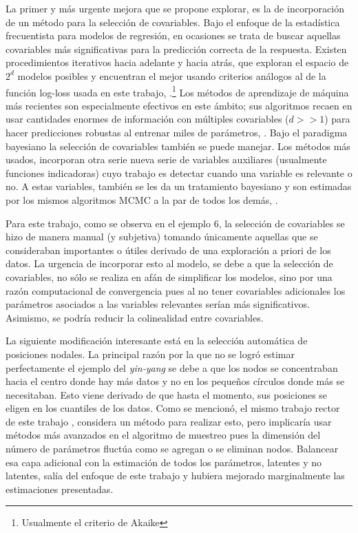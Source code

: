 \documentclass[../Main/Main.tex]{subfiles}
\begin{document}
La primer y más urgente mejora que se propone explorar, es la de incorporación de un método para la selección de covariables. Bajo el enfoque de la estadística frecuentista para modelos de regresión, en ocasiones se trata de buscar aquellas covariables más significativas para la predicción correcta de la respuesta. Existen procedimientos iterativos hacia adelante y hacia atrás, que exploran el espacio de $2^d$ modelos posibles y encuentran el mejor usando criterios análogos al de la función log-loss usada en este trabajo, \citet{bishop2006pattern}.\footnote{Usualmente el criterio de Akaike} Los métodos de aprendizaje de máquina más recientes son especialmente efectivos en este ámbito; sus algoritmos recaen en usar cantidades enormes de información con múltiples covariables ($d>>1$) para hacer predicciones robustas al entrenar miles de parámetros, \citet{nielsen2015neural}. Bajo el paradigma bayesiano la selección de covariables también se puede manejar. Los métodos más usados, incorporan otra serie nueva serie de variables auxiliares (usualmente funciones indicadoras) cuyo trabajo es detectar cuando una variable es relevante o no. A estas variables, también se les da un tratamiento bayesiano y son estimadas por los mismos algoritmos MCMC a la par de todos los demás, \citet{o2009review}.

Para este trabajo, como se observa en el ejemplo 6, la selección de covariables se hizo de manera manual (y subjetiva) tomando únicamente aquellas que se consideraban importantes o útiles derivado de una exploración a priori de los datos. La urgencia de incorporar esto al modelo, se debe a que la selección de covariables, no sólo se realiza en afán de simplificar los modelos, sino por una razón computacional de convergencia pues al no tener covariables adicionales los parámetros asociados a las variables relevantes serían más significativos. Asimismo, se podría reducir la colinealidad entre covariables.

La siguiente modificación interesante está en la selección automática de posiciones nodales. La principal razón por la que no se logró estimar perfectamente el ejemplo del \textit{yin-yang} se debe a que los nodos se concentraban hacia el centro donde hay más datos y no en los pequeños círculos donde más se necesitaban. Esto viene derivado de que hasta el momento, sus posiciones se eligen en los cuantiles de los datos. Como se mencionó, el mismo trabajo rector de este trabajo \citet{mallik1998automatic}, considera un método para realizar esto, pero implicaría usar métodos más avanzados en el algoritmo de muestreo pues la dimensión del número de parámetros fluctúa como se agregan o se eliminan nodos. Balancear esa capa adicional con la estimación de todos los parámetros, latentes y no latentes, salía del enfoque de este trabajo y hubiera mejorado marginalmente las estimaciones presentadas.
\end{document}
